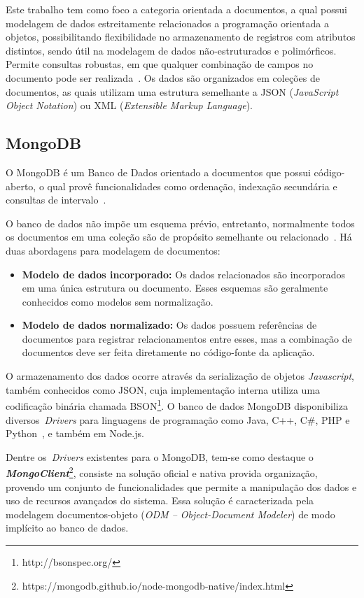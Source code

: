 \documentclass[12pt]{article}
\begin{document}
Este trabalho tem como foco a categoria orientada a documentos, a qual possui modelagem de dados estreitamente relacionados a programação orientada a objetos, possibilitando flexibilidade no armazenamento de registros com atributos distintos, sendo útil na modelagem de dados não-estruturados e polimórficos. Permite consultas robustas, em que qualquer combinação de campos no documento pode ser realizada~\cite{patil:2017}. Os dados são organizados em coleções de documentos, as quais utilizam uma estrutura semelhante a JSON (\emph{JavaScript Object Notation}) ou XML (\emph{Extensible Markup Language}).

\subsection{MongoDB}

O MongoDB é um Banco de Dados orientado a documentos que possui código-aberto, o qual provê funcionalidades como ordenação, indexação secundária e consultas de intervalo~\cite{membrey2011definitive}.
 
O banco de dados não impõe um esquema prévio, entretanto, normalmente todos os documentos em uma coleção são de propósito semelhante ou relacionado~\cite{kanade2014study,lutu2015big}. Há duas abordagens para modelagem de documentos:

\begin{itemize}
\item \textbf{Modelo de dados incorporado:} Os dados relacionados são incorporados em uma única estrutura ou documento. Esses esquemas são geralmente conhecidos como modelos sem normalização. %
\item \textbf{Modelo de dados normalizado:} Os dados possuem referências de documentos para registrar relacionamentos entre esses, mas a combinação de documentos deve ser feita diretamente no código-fonte da aplicação. %
\end{itemize}

O armazenamento dos dados ocorre através da serialização de objetos \textit{Javascript}, também conhecidos como JSON, cuja implementação interna utiliza uma codificação binária chamada BSON\footnote{http://bsonspec.org/}. O banco de dados MongoDB disponibiliza diversos~\emph{Drivers} para linguagens de programação como Java, C++, C\#, PHP e Python~\cite{lutu2015big}, e também em Node.js.

Dentre os~\emph{Drivers} existentes para o MongoDB, tem-se como destaque o \textbf{\textit{MongoClient}}\footnote{https://mongodb.github.io/node-mongodb-native/index.html}, consiste na solução oficial e nativa provida organização, provendo um conjunto de funcionalidades que permite a manipulação dos dados e uso de recursos avançados do sistema. Essa solução é caracterizada pela modelagem documentos-objeto (\emph{ODM -- Object-Document Modeler}) de modo implícito ao banco de dados.
\end{document}
